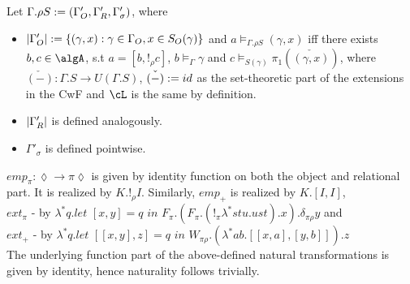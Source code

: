 \documentclass[12pt,a4paper]{article}
\renewcommand{\O}{_{O}}\alwaysmath{O}
\def\R{_{R}}\alwaysmath{R}
\begin{document}
Let $\Gamma . \rho S \define (\Gamma'\O, \Gamma'\R, \Gamma'_\sigma)$, where
\begin{itemize}
  \item $\carr{\Gamma'\O} \define \{(\gamma, x) : \gamma \in \Gamma\O, x \in S\O(\gamma) \}$ and $ a \vDash_{\Gamma. \rho S} (\gamma, x)$ iff there exists $b, c \in \algA$, s.t $a = [b, !_\rho c]$, $b \vDash_{\Gamma} \gamma$ and $c \vDash_{S(\gamma)} \pi_1(\check{(\gamma, x)}) $, where $\check{(-)} : \Gamma . S \to U(\Gamma . S)$, $\check{(-)} := id$ as the set-theoretic part of the extensions in the CwF and $\cL$ is the same by definition.
  
  \item $\carr{\Gamma'\R}$ is defined analogously. 
  
  \item $\Gamma'_\sigma$ is defined pointwise.
\end{itemize}
            
$emp_\pi : \lozenge \to \pi \lozenge$ is given by identity function on both the object and relational part. It is realized by $K. !_\rho I$. Similarly, $emp_+$ is realized by $K . [I, I]$,\\
$ext_\pi$ - by $\lambda^* q. \textit{let }[x, y] = q\textit{ in } F_\pi . (F_\pi. (!_\pi \lambda^* s t u. u s t) . x) . \delta_{\pi \rho} y$ and \\
$ext_+$ - by $\lambda^* q. \textit{let } [[x , y], z] = q \textit{ in } W_{\pi\rho}.(\lambda^* a b. [[x, a],  [y, b]]).z$\\

The underlying function part of the above-defined natural transformations is given by identity, hence naturality follows trivially.

%
%
%
\end{document}
